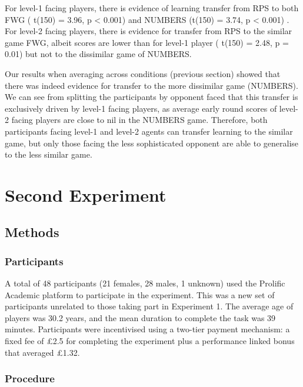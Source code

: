 \documentclass[man,floatsintext]{apa6}
\begin{document}
For level-1 facing players, there is evidence of learning transfer from RPS to both FWG ( t(150) = 3.96, p \textless{} 0.001) and NUMBERS (t(150) = 3.74, p \textless{} 0.001) . For level-2 facing players, there is evidence for transfer from RPS to the similar game FWG, albeit scores are lower than for level-1 player ( t(150) = 2.48, p = 0.01) but not to the dissimilar game of NUMBERS.

Our results when averaging across conditions (previous section) showed that there was indeed evidence for transfer to the more dissimilar game (NUMBERS). We can see from splitting the participants by opponent faced that this transfer is exclusively driven by level-1 facing players, as average early round scores of level-2 facing players are close to nil in the NUMBERS game. Therefore, both participants facing level-1 and level-2 agents can transfer learning to the similar game, but only those facing the less sophisticated opponent are able to generalise to the less similar game.

\newpage

\hypertarget{second-experiment}{%
\section{Second Experiment}\label{second-experiment}}

\hypertarget{methods-1}{%
\subsection{Methods}\label{methods-1}}

\hypertarget{participants-1}{%
\subsubsection{Participants}\label{participants-1}}

A total of 48 participants (21 females, 28 males, 1 unknown) used the Prolific Academic platform to participate in the experiment. This was a new set of participants unrelated to those taking part in Experiment 1. The average age of players was 30.2 years, and the mean duration to complete the task was 39 minutes. Participants were incentivised using a two-tier payment mechanism: a fixed fee of £2.5 for completing the experiment plus a performance linked bonus that averaged £1.32.

\hypertarget{procedure-1}{%
\subsubsection{Procedure}\label{procedure-1}}
\end{document}
